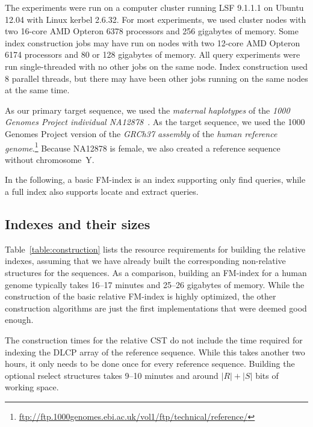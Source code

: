 \documentclass[a4paper,11pt]{llncs}
\newcommand{\abs}[1]{\ensuremath{\lvert #1 \rvert}}
\newcommand{\CST}{\textsf{CST}}
\newcommand{\DLCP}{\textsf{DLCP}}
\newcommand{\rselect}{\textsf{rselect}}
\newcommand{\find}{\textsf{find}}
\newcommand{\locate}{\textsf{locate}}
\newcommand{\extract}{\textsf{extract}}
\begin{document}
The experiments were run on a computer cluster running LSF 9.1.1.1 on Ubuntu 12.04 with Linux kerbel 2.6.32. For most experiments, we used cluster nodes with two 16-core AMD Opteron 6378 processors and 256 gigabytes of memory. Some index construction jobs may have run on nodes with two 12-core AMD Opteron 6174 processors and 80 or 128 gigabytes of memory. All query experiments were run single-threaded with no other jobs on the same node. Index construction used 8 parallel threads, but there may have been other jobs running on the same nodes at the same time.

As our primary target sequence, we used the \emph{maternal haplotypes} of the \emph{1000 Genomes Project individual NA12878}~\cite{Rozowsky2011}. As the target sequence, we used the 1000 Genomes Project version of the \emph{GRCh37 assembly} of the \emph{human reference genome}.\footnote{\url{ftp://ftp.1000genomes.ebi.ac.uk/vol1/ftp/technical/reference/}} Because NA12878 is female, we also created a reference sequence without chromosome~Y.

In the following, a basic FM-index is an index supporting only \find{} queries, while a full index also supports \locate{} and \extract{} queries.

\subsection{Indexes and their sizes}

Table~\ref{table:construction} lists the resource requirements for building the relative indexes, assuming that we have already built the corresponding non-relative structures for the sequences. As a comparison, building an FM-index for a human genome typically takes 16--17 minutes and 25--26 gigabytes of memory. While the construction of the basic relative FM-index is highly optimized, the other construction algorithms are just the first implementations that were deemed good enough.

The construction times for the relative \CST{} do not include the time required for indexing the \DLCP{} array of the reference sequence. While this takes another two hours, it only needs to be done once for every reference sequence. Building the optional \rselect{} structures takes 9--10 minutes and around $\abs{R} + \abs{S}$ bits of working space.
\end{document}
